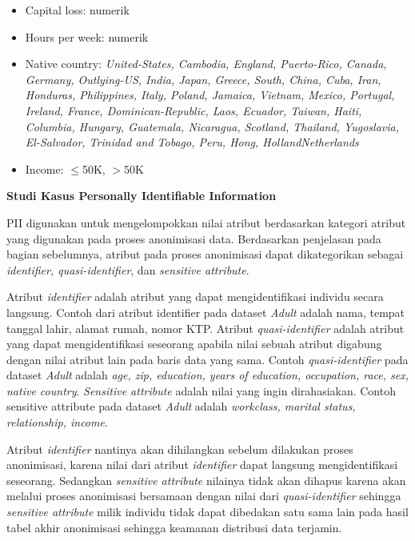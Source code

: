 \documentclass[a4paper,twoside]{article}
\begin{document}
\begin{enumerate}
\begin{itemize}
\item Capital loss: numerik

\item Hours per week: numerik

\item Native country: \textit{United-States, Cambodia, England, Puerto-Rico, Canada, Germany, Outlying-US, India, Japan, Greece, South, China, Cuba, Iran, Honduras, Philippines, Italy, Poland, Jamaica, Vietnam, Mexico, Portugal, Ireland, France, Dominican-Republic, Laos, Ecuador, Taiwan, Haiti, Columbia, Hungary, Guatemala, Nicaragua, Scotland, Thailand, Yugoslavia, El-Salvador, Trinidad and Tobago, Peru, Hong, HollandNetherlands}

\item Income: $\leq$50K, $>$50K
\end{itemize}

\textbf{Studi Kasus Personally Identifiable Information}

PII digunakan untuk mengelompokkan nilai atribut berdasarkan kategori atribut yang digunakan pada proses anonimisasi data. Berdasarkan penjelasan pada bagian sebelumnya, atribut pada proses anonimisasi dapat dikategorikan sebagai \textit{identifier, quasi-identifier}, dan \textit{sensitive attribute}. 
\par Atribut \textit{identifier} adalah atribut yang dapat mengidentifikasi individu secara langsung. Contoh dari atribut identifier pada dataset \textit{Adult} adalah nama, tempat tanggal lahir, alamat rumah, nomor KTP. Atribut \textit{quasi-identifier} adalah atribut yang dapat mengidentifikasi seseorang apabila nilai sebuah atribut digabung dengan nilai atribut lain pada baris data yang sama. Contoh \textit{quasi-identifier} pada dataset \textit{Adult} adalah \textit{age, zip, education, years of education, occupation, race, sex, native country}. \textit{Sensitive attribute} adalah nilai yang ingin dirahasiakan. Contoh sensitive attribute pada dataset \textit{Adult} adalah \textit{workclass, marital status, relationship, income}.
\par Atribut \textit{identifier} nantinya akan dihilangkan sebelum dilakukan proses anonimisasi, karena nilai dari atribut \textit{identifier} dapat langsung mengidentifikasi seseorang. Sedangkan \textit{sensitive attribute} nilainya tidak akan dihapus karena akan melalui proses anonimisasi bersamaan dengan nilai dari \textit{quasi-identifier} sehingga \textit{sensitive attribute} milik individu tidak dapat dibedakan satu sama lain pada hasil tabel akhir anonimisasi sehingga keamanan  distribusi data terjamin.


\end{enumerate}
\end{document}
